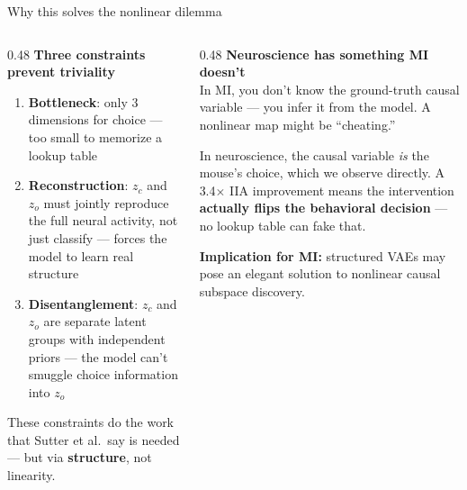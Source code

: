 \documentclass[aspectratio=169,11pt]{beamer}
\begin{document}
\begin{frame}{Why this solves the nonlinear dilemma}
\begin{columns}[T]
\begin{column}{0.48\textwidth}
\textbf{Three constraints prevent triviality}
\begin{enumerate}\setlength\itemsep{4pt}
  \item \textbf{Bottleneck}: only 3 dimensions for choice --- too small to memorize a lookup table
  \item \textbf{Reconstruction}: $z_c$ and $z_o$ must jointly reproduce the full neural activity, not just classify --- forces the model to learn real structure
  \item \textbf{Disentanglement}: $z_c$ and $z_o$ are separate latent groups with independent priors --- the model can't smuggle choice information into $z_o$
\end{enumerate}

\vspace{0.3em}
{\small These constraints do the work that Sutter et al.\ say is needed --- but via \textbf{structure}, not linearity.}
\end{column}
\begin{column}{0.48\textwidth}
\textbf{Neuroscience has something MI doesn't}\\[0.3em]
{\small In MI, you don't know the ground-truth causal variable --- you infer it from the model. A nonlinear map might be ``cheating.''}

\vspace{0.3em}
{\small In neuroscience, the causal variable \emph{is} the mouse's choice, which we observe directly. A 3.4$\times$ IIA improvement means the intervention \textbf{actually flips the behavioral decision} --- no lookup table can fake that.}

\vspace{0.3em}
{\small \textbf{Implication for MI:} structured VAEs may pose an elegant solution to nonlinear causal subspace discovery.}
\end{column}
\end{columns}
\end{frame}
\end{document}
